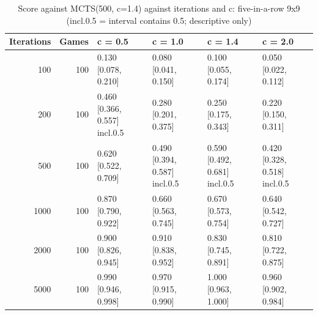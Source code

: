 \begin{table}[!t]
\centering
\caption{Score against MCTS(500, c=1.4) against iterations and c: five-in-a-row 9x9 (incl.0.5 = interval contains 0.5; descriptive only)}
\label{tab:curve_gomoku9}
\small
\begin{tabular}{rrllll}
\toprule
Iterations & Games & c = 0.5 & c = 1.0 & c = 1.4 & c = 2.0 \\
\midrule
100 & 100 & 0.130 [0.078, 0.210] & 0.080 [0.041, 0.150] & 0.100 [0.055, 0.174] & 0.050 [0.022, 0.112] \\
200 & 100 & 0.460 [0.366, 0.557] incl.0.5 & 0.280 [0.201, 0.375] & 0.250 [0.175, 0.343] & 0.220 [0.150, 0.311] \\
500 & 100 & 0.620 [0.522, 0.709] & 0.490 [0.394, 0.587] incl.0.5 & 0.590 [0.492, 0.681] incl.0.5 & 0.420 [0.328, 0.518] incl.0.5 \\
1000 & 100 & 0.870 [0.790, 0.922] & 0.660 [0.563, 0.745] & 0.670 [0.573, 0.754] & 0.640 [0.542, 0.727] \\
2000 & 100 & 0.900 [0.826, 0.945] & 0.910 [0.838, 0.952] & 0.830 [0.745, 0.891] & 0.810 [0.722, 0.875] \\
5000 & 100 & 0.990 [0.946, 0.998] & 0.970 [0.915, 0.990] & 1.000 [0.963, 1.000] & 0.960 [0.902, 0.984] \\
\bottomrule
\end{tabular}
\end{table}

